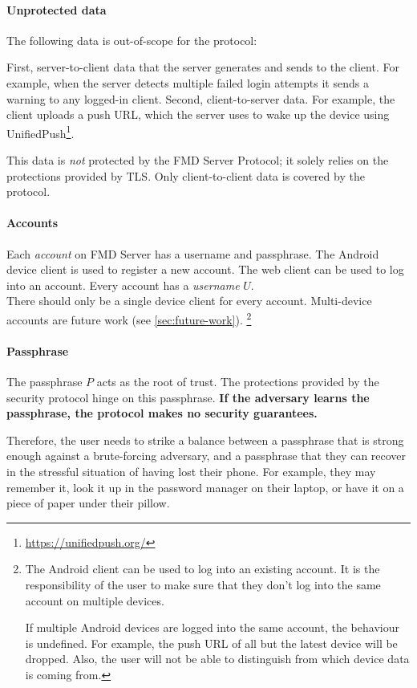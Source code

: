 \documentclass[11pt,a4paper]{article}
\begin{document}
\paragraph{Unprotected data}
The following data is out-of-scope for the protocol:

First, server-to-client data that the server generates and sends to the client.
For example, when the server detects multiple failed login attempts
it sends a warning to any logged-in client.
Second, client-to-server data.
For example, the client uploads a push URL, which the server uses to wake up the device
using UnifiedPush\footnote{\url{https://unifiedpush.org/}}.

This data is \emph{not} protected by the FMD Server Protocol;
it solely relies on the protections provided by TLS.
Only client-to-client data is covered by the protocol.

\paragraph{Accounts}
Each \emph{account} on FMD Server has a username and passphrase.
The Android device client is used to register a new account.
The web client can be used to log into an account.
Every account has a \emph{username} $U$.
\\

There should only be a single device client for every account.
Multi-device accounts are future work (see \autoref{sec:future-work}).
\footnote{
The Android client can be used to log into an existing account.
It is the responsibility of the user to make sure that they don't log into the
same account on multiple devices.

If multiple Android devices are logged into the same account, the behaviour is undefined.
For example, the push URL of all but the latest device will be dropped.
Also, the user will not be able to distinguish from which device data is coming from.
}

\paragraph{Passphrase}
The passphrase $P$ acts as the root of trust.
The protections provided by the security protocol hinge on this passphrase.
\textbf{If the adversary learns the passphrase, the protocol makes no security guarantees.}

Therefore, the user needs to strike a balance between a passphrase
that is strong enough against a brute-forcing adversary, and a passphrase that they can
recover in the stressful situation of having lost their phone.
For example, they may remember it, look it up in the password manager on their laptop,
or have it on a piece of paper under their pillow.
\end{document}
